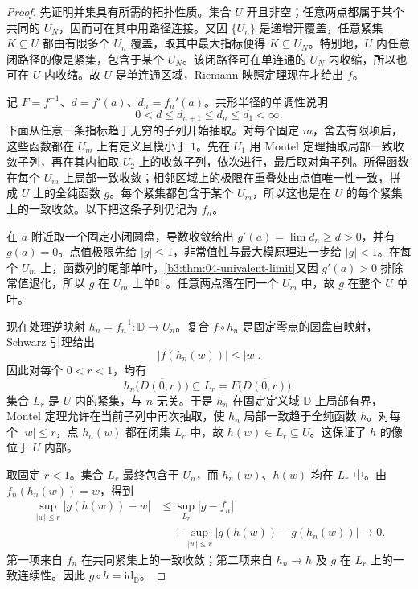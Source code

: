 \begin{proof}
先证明并集具有所需的拓扑性质。集合 \(U\) 开且非空；任意两点都属于某个共同的 \(U_N\)，因而可在其中用路径连接。又因 \(\{U_n\}\) 是递增开覆盖，任意紧集 \(K\subseteq U\) 都由有限多个 \(U_n\) 覆盖，取其中最大指标便得 \(K\subseteq U_N\)。特别地，\(U\) 内任意闭路径的像是紧集，包含于某个 \(U_N\)。该闭路径可在单连通的 \(U_N\) 内收缩，所以也可在 \(U\) 内收缩。故 \(U\) 是单连通区域，Riemann 映照定理现在才给出 \(f\)。

记 \(F=f^{-1}\)、\(d=f'(a)\)、\(d_n=f_n'(a)\)。共形半径的单调性说明
\[
 0<d\le d_{n+1}\le d_n\le d_1<\infty.
\]
下面从任意一条指标趋于无穷的子列开始抽取。对每个固定 \(m\)，舍去有限项后，这些函数都在 \(U_m\) 上有定义且模小于 \(1\)。先在 \(U_1\) 用 Montel 定理抽取局部一致收敛子列，再在其内抽取 \(U_2\) 上的收敛子列，依次进行，最后取对角子列。所得函数在每个 \(U_m\) 上局部一致收敛；相邻区域上的极限在重叠处由点值唯一性一致，拼成 \(U\) 上的全纯函数 \(g\)。每个紧集都包含于某个 \(U_m\)，所以这也是在 \(U\) 的每个紧集上的一致收敛。以下把这条子列仍记为 \(f_n\)。

在 \(a\) 附近取一个固定小闭圆盘，导数收敛给出 \(g'(a)=\lim d_n\ge d>0\)，并有 \(g(a)=0\)。点值极限先给 \(|g|\le1\)，非常值性与最大模原理进一步给 \(|g|<1\)。在每个 \(U_m\) 上，函数列的尾部单叶，\cref{b3:thm:04-univalent-limit}又因 \(g'(a)>0\) 排除常值退化，所以 \(g\) 在 \(U_m\) 上单叶。任意两点落在同一个 \(U_m\) 中，故 \(g\) 在整个 \(U\) 单叶。

现在处理逆映射 \(h_n=f_n^{-1}:\mathbb D\rightarrow U_n\)。复合 \(f\circ h_n\) 是固定零点的圆盘自映射，Schwarz 引理给出
\[
 |f(h_n(w))|\le|w|.
\]
因此对每个 \(0<r<1\)，均有
\[
 h_n\bigl(\overline{D(0,r)}\bigr)
 \subseteq L_r=F\bigl(\overline{D(0,r)}\bigr).
\]
集合 \(L_r\) 是 \(U\) 内的紧集，与 \(n\) 无关。于是 \(h_n\) 在固定定义域 \(\mathbb D\) 上局部有界，Montel 定理允许在当前子列中再次抽取，使 \(h_n\) 局部一致趋于全纯函数 \(h\)。对每个 \(|w|\le r\)，点 \(h_n(w)\) 都在闭集 \(L_r\) 中，故 \(h(w)\in L_r\subseteq U\)。这保证了 \(h\) 的像位于 \(U\) 内部。

取固定 \(r<1\)。集合 \(L_r\) 最终包含于 \(U_n\)，而 \(h_n(w)\)、\(h(w)\) 均在 \(L_r\) 中。由 \(f_n(h_n(w))=w\)，得到
\[
 \begin{aligned}
 \sup_{|w|\le r}|g(h(w))-w|
 &\le\sup_{L_r}|g-f_n|\\
 &\quad+\sup_{|w|\le r}|g(h(w))-g(h_n(w))|
 \longrightarrow0.
 \end{aligned}
\]
第一项来自 \(f_n\) 在共同紧集上的一致收敛；第二项来自 \(h_n\rightarrow h\) 及 \(g\) 在 \(L_r\) 上的一致连续性。因此 \(g\circ h=\mathrm{id}_{\mathbb D}\)。


\end{proof}
